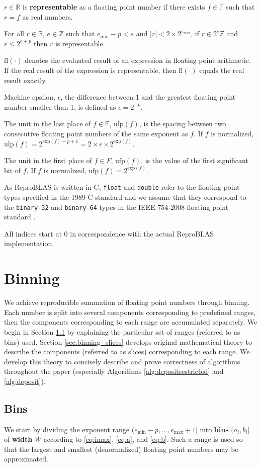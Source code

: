 \documentclass[12pt]{article}
\providecommand{\R}{\ensuremath{\mathbb{R}}}
\providecommand{\F}{\ensuremath{\mathbb{F}}}
\providecommand{\Z}{\ensuremath{\mathbb{Z}}}
\providecommand{\exp}{\ensuremath{\text{exp}}}
\providecommand{\min}{\ensuremath{\text{min}}}
\providecommand{\max}{\ensuremath{\text{max}}}
\providecommand{\ulp}{\ensuremath{\text{ulp}}}
\providecommand{\ufp}{\ensuremath{\text{ufp}}}
\providecommand{\fl}{\ensuremath{\text{fl}}}
\theoremstyle{definition}
\numberwithin{equation}{section}
\numberwithin{figure}{section}
\begin{document}
  $r \in \R$ is \textbf{representable} as a floating point number if there exists $f \in \F$ such that $r = f$ as real numbers.

  For all $r \in \R$, $e \in \Z$ such that $e_{\min} - p < e$ and $|r| < 2 \times 2^{e_{\max}}$, if $r \in 2^e\Z$ and $r \leq 2^{e + p}$ then $r$ is representable.

  $\fl(\cdot)$ denotes the evaluated result of an expression in floating point arithmetic. If the real result of the expression is representable, then $\fl(\cdot)$ equals the real result exactly.

  Machine epsilon, $\epsilon$, the difference between 1 and the greatest floating point number smaller than 1, is defined as $\epsilon = 2^{-p}$.

  The unit in the last place of $f \in \F$, $\ulp(f)$, is the spacing between two consecutive floating point numbers of the same exponent as $f$. If $f$ is normalized, $\ulp(f) = 2^{\exp(f) - p + 1} = 2 \times \epsilon \times 2^{\exp(f)}$.

  The unit in the first place of $f \in F$, $\ufp(f)$, is the value of the first significant bit of $f$. If $f$ is normalized, $\ufp(f) = 2^{\exp(f)}$.

  As ReproBLAS is written in C, \texttt{float} and \texttt{double} refer to the floating point types specified in the 1989 C standard \cite{c89} and we assume that they correspond to the \texttt{binary-32} and \texttt{binary-64} types in the IEEE 754-2008 floating point standard \cite{ieee754}.

  All indices start at $0$ in correspondence with the actual ReproBLAS implementation.
\section{Binning}
  \label{sec:binning}
    We achieve reproducible summation of floating point numbers through binning. Each number is split into several components corresponding to predefined ranges, then the components corresponding to each range are accumulated separately. We begin in Section \ref{sec:binning_bins} by explaining the particular set of ranges (referred to as bins) used. Section \ref{sec:binning_slices} develops original mathematical theory to describe the components (referred to as slices) corresponding to each range. We develop this theory to concisely describe and prove correctness of algorithms throughout the paper (especially Algorithms \ref{alg:depositrestricted} and \ref{alg:deposit}).
  \subsection{Bins}
    \label{sec:binning_bins}
    We start by dividing the exponent range $(e_{\min} - p, ..., e_{\max} + 1]$  into \textbf{bins} $(a_i, b_i]$ of \textbf{width} $W$ according to \eqref{eq:imax}, \eqref{eq:a}, and \eqref{eq:b}. Such a range is used so that the largest and smallest (denormalized) floating point numbers may be approximated.
\end{document}
